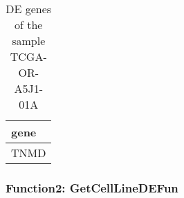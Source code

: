 \documentclass[]{article}
\begin{document}
\begin{table}

\caption{\label{tab:unnamed-chunk-78}DE genes of the sample TCGA-OR-A5J1-01A}
\centering
\begin{tabular}[t]{l}
\hline
gene\\
\hline
TNMD\\
\hline
\end{tabular}
\end{table}

\hypertarget{function2-getcelllinedefun}{%
\subsubsection{\texorpdfstring{ Function2: GetCellLineDEFun}{  Function2: GetCellLineDEFun}}\label{function2-getcelllinedefun}}
\end{document}
